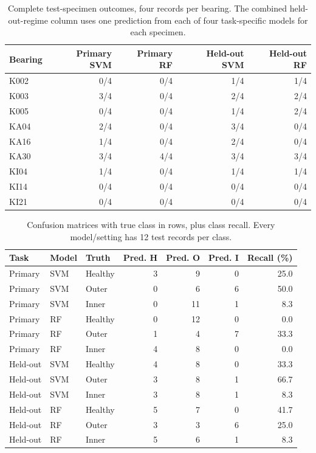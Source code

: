\documentclass[11pt,a4paper]{article}
\begin{document}
\begin{table}[htbp]\centering\small
\caption{Complete test-specimen outcomes, four records per bearing. The combined held-out-regime column uses one prediction from each of four task-specific models for each specimen.}
\label{tab:bearing_specimens}
\begin{tabular}{@{}lrrrr@{}}\toprule
Bearing & Primary SVM & Primary RF & Held-out SVM & Held-out RF \\\midrule
K002 & 0/4 & 0/4 & 1/4 & 1/4 \\
K003 & 3/4 & 0/4 & 2/4 & 2/4 \\
K005 & 0/4 & 0/4 & 1/4 & 2/4 \\
KA04 & 2/4 & 0/4 & 3/4 & 0/4 \\
KA16 & 1/4 & 0/4 & 2/4 & 0/4 \\
KA30 & 3/4 & 4/4 & 3/4 & 3/4 \\
KI04 & 1/4 & 0/4 & 1/4 & 1/4 \\
KI14 & 0/4 & 0/4 & 0/4 & 0/4 \\
KI21 & 0/4 & 0/4 & 0/4 & 0/4 \\
\bottomrule\end{tabular}
\end{table}

\begin{table}[htbp]\centering\small
\caption{Confusion matrices with true class in rows, plus class recall. Every model/setting has 12 test records per class.}
\label{tab:bearing_confusion}
\begin{tabular}{@{}lllrrrr@{}}\toprule
Task & Model & Truth & Pred. H & Pred. O & Pred. I & Recall (\%) \\\midrule
Primary & SVM & Healthy & 3 & 9 & 0 & 25.0 \\
Primary & SVM & Outer & 0 & 6 & 6 & 50.0 \\
Primary & SVM & Inner & 0 & 11 & 1 & 8.3 \\
Primary & RF & Healthy & 0 & 12 & 0 & 0.0 \\
Primary & RF & Outer & 1 & 4 & 7 & 33.3 \\
Primary & RF & Inner & 4 & 8 & 0 & 0.0 \\
Held-out & SVM & Healthy & 4 & 8 & 0 & 33.3 \\
Held-out & SVM & Outer & 3 & 8 & 1 & 66.7 \\
Held-out & SVM & Inner & 3 & 8 & 1 & 8.3 \\
Held-out & RF & Healthy & 5 & 7 & 0 & 41.7 \\
Held-out & RF & Outer & 3 & 3 & 6 & 25.0 \\
Held-out & RF & Inner & 5 & 6 & 1 & 8.3 \\
\bottomrule\end{tabular}
\end{table}
\end{document}
